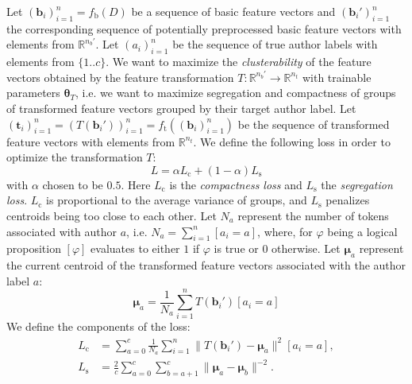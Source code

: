 \documentclass[10pt, a4paper]{article}
\newcommand{\vect}[1]{\bm{#1}}
\begin{document}
Let $(\vect{b}_i)_{i=1}^n = f_\mathrm{b}(D)$ be a sequence of basic feature vectors and $(\vect{b}_i')_{i=1}^n$ the corresponding sequence of potentially preprocessed basic feature vectors with elements from $\mathbb{R}^{n_{b}'}$. Let $(a_i)_{i=1}^n$ be the sequence of true author labels with elements from $\{1..c\}$. We want to maximize the \emph{clusterability} of the feature vectors obtained by the feature transformation $T:\mathbb{R}^{n_b'}\rightarrow\mathbb{R}^{n_t}$ with trainable parameters $\vect{\theta}_T$, i.e. we want to maximize segregation and compactness of groups of transformed feature vectors grouped by their target author label. Let $(\vect{t}_i)_{i=1}^n = (T(\boldsymbol{b}_i'))_{i=1}^n = f_\mathrm{t}((\vect{b}_i)_{i=1}^n)$ be the sequence of transformed feature vectors with elements from $\mathbb{R}^{n_t}$. We define the following loss in order to optimize the transformation $T$:
\begin{equation}
	L = \alpha L_\mathrm{c} + (1-\alpha)L_\mathrm{s}
\end{equation}
with $\alpha$ chosen to be $0.5$. Here $L_\mathrm{c}$ is the \emph{compactness loss} and $L_\mathrm{s}$ the \emph{segregation loss}. $L_\mathrm{c}$ is proportional to the average variance of groups, and $L_\mathrm{s}$ penalizes centroids being too close to each other. Let $N_a$ represent the number of tokens associated with author $a$, i.e. $N_a = \sum_{i=1}^n[a_i=a]$, where, for $\varphi$ being a logical proposition $[\varphi]$ evaluates to either $1$ if $\varphi$ is true or $0$ otherwise.
Let $\vect{\mu}_a$ represent the current centroid of the transformed feature vectors associated with the author label $a$:
\begin{equation}
\vect{\mu}_a = \frac{1}{N_a}\sum_{i=1}^n T(\vect{b}_i')[a_i=a]
\end{equation}	
We define the components of the loss: 
\begin{align}
	L_\mathrm{c} &= \sum_{a=0}^{c}\frac{1}{N_a} 
		\sum_{i=1}^{n} \| T(\vect{b}_i')-\vect{\mu}_{a}\|^2 [a_i=a], \\
	L_\mathrm{s} &= \frac{2}{c}\sum_{a=0}^{c}\sum_{b=a+1}^{c} \|\vect{\mu}_a-\vect{\mu}_b\|^{-2}.
\end{align}
\end{document}
